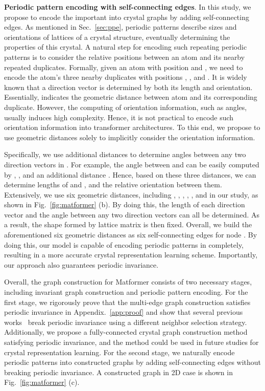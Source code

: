 \documentclass{article}
\begin{document}
\textbf{Periodic pattern encoding with self-connecting edges}. In this study, we propose to encode the important  into crystal graphs by adding self-connecting edges. As mentioned in Sec.~\ref{sec:ppe}, periodic patterns 
describe sizes and orientations of lattices of a crystal structure,
eventually determining the properties of this crystal.
A natural step for encoding such repeating periodic patterns is to consider the relative positions between an atom and its nearby repeated duplicates.
Formally, given an atom  with position 
and ,
we need to encode the atom's three nearby duplicates with positions , , and .
It is widely known that a direction vector  is determined
by both its length  and orientation.
Essentially,  indicates the geometric
distance between atom  and its corresponding duplicate.
However, the computing of orientation information, such as angles, usually induces high
complexity. Hence, it is not practical to encode such orientation information into transformer architectures.
To this end, we propose to use geometric distances solely to
implicitly consider the orientation information. 

Specifically, we
use additional distances to determine angles between any two direction vectors in . 
For example, 
the angle between  and  can be easily computed by 
, , 
and an additional distance .
Hence, based on these three distances,
we can determine lengths of  and ,
and the relative orientation between them.
Extensively, 
we use six geometric distances, including , , ,
, , and 
in our study, as shown in Fig.~\ref{fig:matformer} (b).
By doing this, the length of each direction vector 
and the angle between any two direction vectors can all be determined.
As a result, the shape formed by lattice matrix 
is then fixed.
Overall, we build the aforementioned six geometric
distances as six
self-connecting edges for node .
By doing this, our model is capable of
encoding periodic patterns in  completely,
resulting in a more accurate crystal representation learning scheme.
Importantly, 
our approach also guarantees periodic invariance.






Overall, the graph construction for Matformer consists of two necessary stages, including invariant graph construction and periodic pattern encoding. For the first stage, we rigorously prove that the multi-edge graph construction satisfies periodic invariance in Appendix.~\ref{app:proof} and show that several previous works~\citep{cgcnn, gatgnn} break periodic invariance using a different neighbor selection strategy. Additionally, we propose a fully-connected crystal graph construction method satisfying periodic invariance, and the method could be used in future studies for crystal representation learning.
For the second stage, we naturally encode periodic patterns into constructed graphs by adding self-connecting edges without breaking periodic invariance. A constructed graph in 2D case is shown in Fig.~\ref{fig:matformer} (c).
\end{document}
